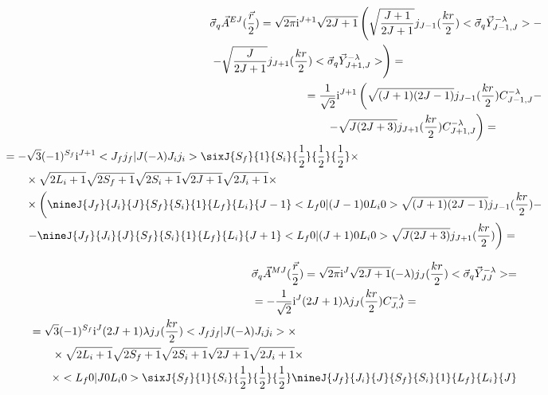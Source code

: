 \begin{align}
    \begin{split}
        &\vec{\sigma}_q \vec{A}^{EJ}(\frac{\vec{r}}{2}) = \sqrt{2\pi} \mathrm{i}^{J+1} \sqrt{2J+1} \left( \sqrt{\frac{J+1}{2J+1}} j_{J-1}(\frac{kr}{2})<\vec{\sigma}_q \vec{Y}^{- \lambda}_{J-1, J}> - \right.\\
        &\left. -\sqrt{\frac{J}{2J+1}} j_{J+1}(\frac{kr}{2}) <\vec{\sigma}_q \vec{Y}_{J+1, J}^{- \lambda}> \right) =
    \end{split}\\
    \begin{split}
        &= \frac{1}{\sqrt{2}} \mathrm{i}^{J+1} \left( \sqrt{(J+1)(2J-1)} j_{J-1}(\frac{kr}{2}) C_{J-1, J}^{- \lambda} - \right.\nonumber \\
        &\qquad \left.- \sqrt{J(2J+3)} j_{J+1}(\frac{kr}{2}) C_{J+1, J}^{- \lambda} \right) =
    \end{split}\\
    \begin{split}
        &= -\sqrt{3} (-1)^{S_f} \mathrm{i}^{J+1} <J_f j_f| J (-\lambda) J_i j_i> \sixJ{S_f}{1}{S_i}{\frac{1}{2}}{\frac{1}{2}}{\frac{1}{2}} \times \\
        &\qquad\times \sqrt{2L_i+1} \sqrt{2S_f+1} \sqrt{2S_i + 1} \sqrt{2J+1} \sqrt{2J_i+1} \times \\
        &\qquad\times \left( \nineJ{J_f}{J_i}{J}{S_f}{S_i}{1}{L_f}{L_i}{J-1} <L_f 0 | (J-1) 0 L_i 0> \sqrt{(J+1)(2J-1)} j_{J-1}(\frac{kr}{2}) - \right.\nonumber \\
        &\qquad \left.- \nineJ{J_f}{J_i}{J}{S_f}{S_i}{1}{L_f}{L_i}{J+1} <L_f 0 | (J+1) 0 L_i 0> \sqrt{J(2J+3)} j_{J+1}(\frac{kr}{2}) \right) =
    \end{split}\\
\end{align}

\begin{align}
    \begin{split}
        &\vec{\sigma}_q \vec{A}^{MJ}(\frac{\vec{r}}{2}) = \sqrt{2\pi }\mathrm{i}^J \sqrt{2J + 1} (- \lambda) j_J(\frac{kr}{2}) <\vec{\sigma}_q \vec{Y}^{- \lambda}_{JJ}> = \\
        &= -\frac{1}{\sqrt{2}} \mathrm{i}^J (2J + 1) \lambda j_J(\frac{kr}{2}) C_{J, J}^{- \lambda} =
    \end{split}\\
    \begin{split}
        &= \sqrt{3} (-1)^{S_f} \mathrm{i}^J (2J + 1) \lambda j_J(\frac{kr}{2}) <J_f j_f| J (-\lambda) J_i j_i> \times \\
        &\qquad\times \sqrt{2L_i+1} \sqrt{2S_f+1} \sqrt{2S_i + 1} \sqrt{2J+1} \sqrt{2J_i+1} \times \\
        &\qquad\times <L_f 0 | J 0 L_i 0> \sixJ{S_f}{1}{S_i}{\frac{1}{2}}{\frac{1}{2}}{\frac{1}{2}} \nineJ{J_f}{J_i}{J}{S_f}{S_i}{1}{L_f}{L_i}{J}
    \end{split}
\end{align}

